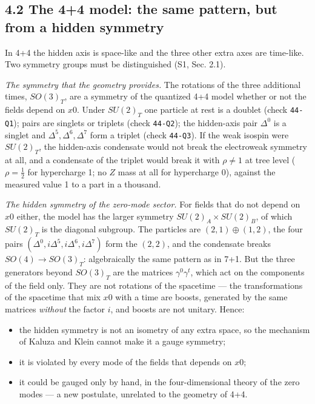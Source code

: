\documentclass[
  10pt,
]{article}
\providecommand{\tightlist}{%
  \setlength{\itemsep}{0pt}\setlength{\parskip}{0pt}}
\begin{document}
\hypertarget{the-44-model-the-same-pattern-but-from-a-hidden-symmetry}{%
\subsection{4.2 The 4+4 model: the same pattern, but from a hidden
symmetry}\label{the-44-model-the-same-pattern-but-from-a-hidden-symmetry}}

In 4+4 the hidden axis is space-like and the three other extra axes are
time-like. Two symmetry groups must be distinguished (S1, Sec. 2.1).

\emph{The symmetry that the geometry provides.} The rotations of the
three additional times, \(SO(3)_T\), are a symmetry of the quantized 4+4
model whether or not the fields depend on \(x0\). Under \(SU(2)_T\) one
particle at rest is a doublet (check \texttt{44-Q1}); pairs are singlets
or triplets (check \texttt{44-Q2}); the hidden-axis pair \(\Delta^0\) is
a singlet and \(\Delta^5,\Delta^6,\Delta^7\) form a triplet (check
\texttt{44-Q3}). If the weak isospin were \(SU(2)_T\), the hidden-axis
condensate would not break the electroweak symmetry at all, and a
condensate of the triplet would break it with \(\rho\ne1\) at tree level
(\(\rho=\tfrac12\) for hypercharge 1; no \(Z\) mass at all for
hypercharge 0), against the measured value 1 to a part in a thousand.

\emph{The hidden symmetry of the zero-mode sector.} For fields that do
not depend on \(x0\) either, the model has the larger symmetry
\(SU(2)_A\times SU(2)_B\), of which \(SU(2)_T\) is the diagonal
subgroup. The particles are \((2,1)\oplus(1,2)\), the four pairs
\((\Delta^0,i\Delta^5,i\Delta^6,i\Delta^7)\) form the \((2,2)\), and the
condensate breaks \(SO(4)\to SO(3)_T\): algebraically the same pattern
as in 7+1. But the three generators beyond \(SO(3)_T\) are the matrices
\(\gamma^0\gamma^t\), which act on the components of the field only.
They are not rotations of the spacetime --- the transformations of the
spacetime that mix \(x0\) with a time are boosts, generated by the same
matrices \emph{without} the factor \(i\), and boosts are not unitary.
Hence:

\begin{itemize}
\tightlist
\item
  the hidden symmetry is not an isometry of any extra space, so the
  mechanism of Kaluza and Klein cannot make it a gauge symmetry;
\item
  it is violated by every mode of the fields that depends on \(x0\);
\item
  it could be gauged only by hand, in the four-dimensional theory of the
  zero modes --- a new postulate, unrelated to the geometry of 4+4.
\end{itemize}
\end{document}

